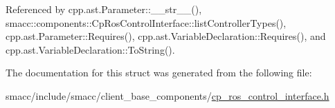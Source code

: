 Referenced by cpp.\+ast.\+Parameter\+::\+\_\+\+\_\+str\+\_\+\+\_\+(), smacc\+::components\+::\+Cp\+Ros\+Control\+Interface\+::list\+Controller\+Types(), cpp.\+ast.\+Parameter\+::\+Requires(), cpp.\+ast.\+Variable\+Declaration\+::\+Requires(), and cpp.\+ast.\+Variable\+Declaration\+::\+To\+String().



The documentation for this struct was generated from the following file\+:\begin{DoxyCompactItemize}
\item 
smacc/include/smacc/client\+\_\+base\+\_\+components/\hyperlink{cp__ros__control__interface_8h}{cp\+\_\+ros\+\_\+control\+\_\+interface.\+h}\end{DoxyCompactItemize}
